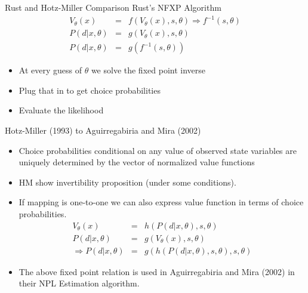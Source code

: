 \begin{frame}{Rust and Hotz-Miller Comparison}
Rust's NFXP Algorithm
\begin{eqnarray*}
V_{\theta}(x) &=& f(V_{\theta}(x),s,\theta) \Rightarrow  f^{-1}(s,\theta)  \\
P(d | x,\theta) &=& g(V_{\theta}(x),s,\theta) \\
P(d | x,\theta) &=& g(f^{-1}(s,\theta)) 
\end{eqnarray*}
\begin{itemize}
\item At every guess of $\theta$ we solve the fixed point inverse
\item Plug that in to get choice probabilities
\item Evaluate the likelihood
\end{itemize}
\end{frame}


\begin{frame}{Hotz-Miller (1993) to Aguirregabiria and Mira (2002)}
\begin{itemize}
\item Choice probabilities conditional on any value of observed state variables are uniquely determined by the vector of normalized value functions
\item HM show invertibility proposition (under some conditions).
\item If mapping is one-to-one we can also express value function in terms of choice probabilities. 
\begin{eqnarray*}
V_{\theta}(x) &=& h(P(d | x,\theta),s,\theta)\\
P(d | x,\theta) &=& g(V_{\theta}(x),s,\theta) \\
\Rightarrow P(d | x,\theta) &=& g(h(P(d | x, \theta),s ,\theta),s,\theta)
\end{eqnarray*}
\item The above fixed point relation is used in Aguirregabiria and Mira (2002) in their NPL Estimation algorithm.
\end{itemize}
\end{frame}

